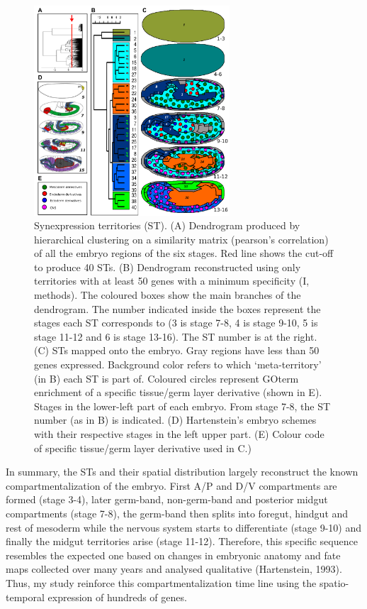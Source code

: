 \begin{figure}[h]
  \includegraphics[width=0.65\textwidth]{./Images/Art-I/territories.png}
  \centering
  \caption{Synexpression territories (ST). (A) Dendrogram produced by hierarchical clustering on a similarity matrix (pearson's correlation) of all the embryo regions of the six stages. Red line shows the cut-off to produce 40 STs. (B) Dendrogram reconstructed using only territories with at least 50 genes with a minimum specificity (I, methods). The coloured boxes show the main branches of the dendrogram. The number indicated inside the boxes represent the stages each ST corresponds to (3 is stage 7-8, 4 is stage 9-10, 5 is stage 11-12 and 6 is stage 13-16). The ST number is at the right. (C) STs mapped onto the embryo. Gray regions have less than 50 genes expressed. Background color refers to which `meta-territory' (in B) each ST is part of. Coloured circles represent GOterm enrichment of a specific tissue/germ layer derivative (shown in E). Stages in the lower-left part of each embryo. From stage 7-8, the ST number (as in B) is indicated. (D) Hartenstein's embryo schemes \citep{Hartenstein1993} with their respective stages in the left upper part. (E) Colour code of specific tissue/germ layer derivative used in C.)}
  \label{fig:Art-I-territories}
\end{figure}

In summary, the STs and their spatial distribution largely reconstruct the known compartmentalization of the embryo. First A/P and D/V compartments are formed (stage 3-4), later germ-band, non-germ-band and posterior midgut compartments (stage 7-8), the germ-band then splits into foregut, hindgut and rest of mesoderm while the nervous system starts to differentiate (stage 9-10) and finally the midgut territories arise (stage 11-12).
Therefore, this specific sequence resembles the expected one based on changes in embryonic anatomy and fate maps collected over many years and analysed qualitative (Hartenstein, 1993). 
Thus, my study reinforce this compartmentalization time line using the spatio-temporal expression of hundreds of genes.

